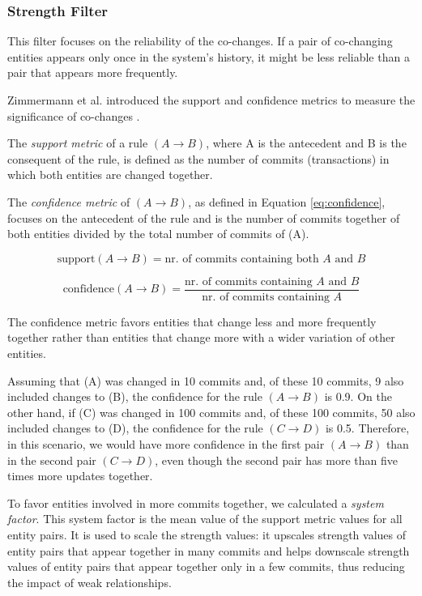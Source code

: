 \documentclass{ieeeaccess}
\begin{document}
\subsubsection{Strength Filter}

This filter focuses on the reliability of the co-changes. If a pair of co-changing entities appears only once in the system's history, it might be less reliable than a pair that appears more frequently.

Zimmermann et al. introduced the support and confidence metrics to measure the significance of co-changes \cite{b7}.

The \textit{support metric} of a rule $(A \rightarrow B)$, where A is the antecedent and B is the consequent of the rule, is defined as the number of commits (transactions) in which both entities are changed together.

The \textit{confidence metric} of $(A \rightarrow B)$, as defined in Equation \eqref{eq:confidence}, focuses on the antecedent of the rule and is the number of commits together of both entities divided by the total number of commits of (A).

\begin{equation} \text{support}(A \rightarrow B) = \text{nr. of commits containing both } A \text{ and } B \label{eq:support} 
\end{equation}

\begin{equation}
\text{confidence}(A \rightarrow B) = \frac{\text{nr. of commits containing } A \text{ and } B}{\text{nr. of commits containing } A}
\label{eq:confidence}
\end{equation}


The confidence metric favors entities that change less and more frequently together rather than entities that change more with a wider variation of other entities.

Assuming that (A) was changed in 10 commits and, of these 10 commits, 9 also included changes to (B), the confidence for the rule $(A \rightarrow B)$ is 0.9. On the other hand, if (C) was changed in 100 commits and, of these 100 commits, 50 also included changes to (D), the confidence for the rule $(C \rightarrow D)$ is 0.5. Therefore, in this scenario, we would have more confidence in the first pair $(A \rightarrow B)$ than in the second pair $(C \rightarrow D)$, even though the second pair has more than five times more updates together.

To favor entities involved in more commits together, we calculated a \textit{system factor}. This system factor is the mean value of the support metric values for all entity pairs. It is used to scale the strength values: it upscales strength values of entity pairs that appear together in many commits and helps downscale strength values of entity pairs that appear together only in a few commits, thus reducing the impact of weak relationships.
\end{document}
